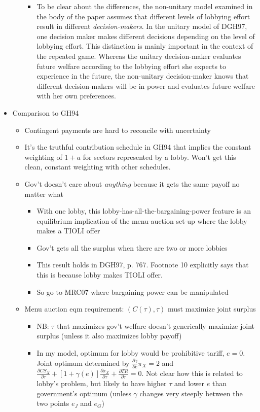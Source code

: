 \documentclass[12pt]{article}
\newcommand{\ga}{\gamma}
\begin{document}
\begin{itemize}
\begin{itemize}
\begin{itemize}
						\item To be clear about the differences, the non-unitary model examined in the body of the paper assumes that different levels of lobbying effort result in different \textit{decision-makers}. In the unitary model of DGH97, one decision maker makes different decisions depending on the level of lobbying effort. This distinction is mainly important in the context of the repeated game. Whereas the unitary decision-maker evaluates future welfare according to the lobbying effort she expects to experience in the future, the non-unitary decision-maker knows that different decision-makers will be in power and evaluates future welfare with her own preferences.
					\end{itemize}
			\end{itemize}
		\item Comparison to GH94
			\begin{itemize}
				\item Contingent payments are hard to reconcile with uncertainty
				\item It's the truthful contribution schedule in GH94 that implies the constant weighting of $1+a$ for sectors represented by a lobby. Won't get this clean, constant weighting with other schedules.
				\item Gov't doesn't care about \textit{anything} because it gets the same payoff no matter what
					\begin{itemize}
						\item With one lobby, this lobby-has-all-the-bargaining-power feature is an equilibrium implication of the menu-auction set-up where the lobby makes a TIOLI offer
						\item Gov't gets all the surplus when there are two or more lobbies
						\item This result holds in DGH97, p. 767. Footnote 10 explicitly says that this is because lobby makes TIOLI offer.
						\item So go to MRC07 where bargaining power can be manipulated
					\end{itemize}
				\item Menu auction eqm requirement: $(C(\tau),\tau)$ must maximize joint surplus
					\begin{itemize}
						\item NB: $\tau$ that maximizes gov't welfare doesn't generically maximize joint surplus (unless it also maximizes lobby payoff)
						\item In my model, optimum for lobby would be prohibitive tariff, $e=0$. Joint optimum determined by $\frac{\partial \ga}{\partial e}\pi_X = 2$ and $\frac{\partial CS_X}{\partial \tau} + \left[ 1 + \ga(e)\right]\frac{\partial \pi_X}{\partial \tau} + \frac{\partial TR}{\partial \tau} = 0$. Not clear how this is related to lobby's problem, but likely to have higher $\tau$ and lower $e$ than government's optimum (unless $\ga$ changes very steeply between the two points $e_J$ and $e_G$)

\end{itemize}
\end{itemize}
\end{itemize}
\end{document}
